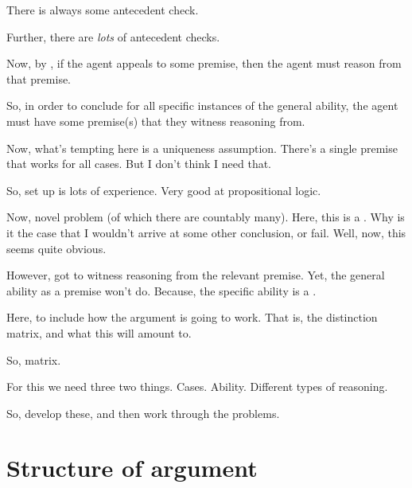 \begin{note}
  There is always some antecedent check.

  Further, there are \emph{lots} of antecedent checks.

  Now, by \ESU{}, if the agent appeals to some premise, then the agent must reason from that premise.

  So, in order to conclude for all specific instances of the general ability, the agent must have some premise(s) that they witness reasoning from.

  Now, what's tempting here is a uniqueness assumption.
  There's a single premise that works for all cases.
  But I don't think I need that.
  
\end{note}

\begin{note}
  So, set up is lots of experience.
  Very good at propositional logic.

  Now, novel problem (of which there are countably many).
  Here, this is a \requ{}.
  Why is it the case that I wouldn't arrive at some other conclusion, or fail.
  Well, now, this seems quite obvious.

  However, \ESU{} got to witness reasoning from the relevant premise.
  Yet, the general ability as a premise won't do.
  Because, the specific ability is a \requ{}.
\end{note}

\begin{note}
  Here, to include how the argument is going to work.
  That is, the distinction matrix, and what this will amount to.

  So, matrix.

  For this we need three two things.
  Cases.
  Ability.
  Different types of reasoning.

  So, develop these, and then work through the problems.
\end{note}

\section{Structure of argument}
\label{sec:structure-argument}

